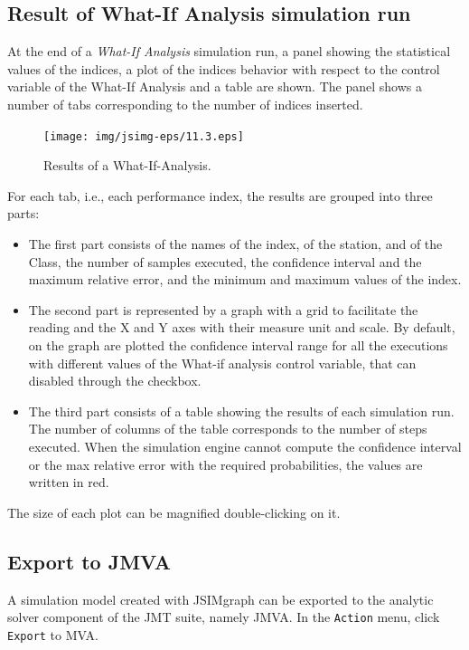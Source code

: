\subsection{Result of What-If Analysis simulation run}
At the end of a \emph{What-If Analysis} simulation run, a panel
showing the statistical values of the indices, a plot of the
indices behavior with respect to the control variable of the
What-If Analysis and a table are shown. The panel shows a number
of tabs
corresponding to the number of indices inserted.\\
\begin{figure}[htb]
    \begin{center}
        \texttt{[image: img/jsimg-eps/11.3.eps]}
    \end{center}
    \caption{Results of a What-If-Analysis.}
    \label{fig:reswia}
\end{figure}
For each tab, i.e., each performance index, the results are
grouped into three parts:
\begin{itemize}
\item  The first part consists of the names of the index, of the
station, and of the Class, the number of samples executed, the
confidence interval and the maximum relative error, and the
minimum and maximum values of the index.

\item   The second part is represented by a graph with a grid to
facilitate the reading and the X and Y axes with their measure
unit and scale. By default, on the graph are plotted the
confidence interval range for all the executions with different
values of the What-if analysis control variable, that can disabled
through the checkbox.

\item  The third part consists of a table showing the results of
each simulation run. The number of columns of the table
corresponds to the number of steps executed. When the simulation
engine cannot compute the confidence interval or the max relative
error with the required probabilities, the values are written in
red.
\end{itemize}
The size of each plot can be magnified double-clicking on it.

\subsection{Export to JMVA}
A simulation model created with JSIMgraph can be exported to the
analytic solver component of the JMT suite, namely JMVA. In the
\texttt{Action} menu, click \texttt{Export} to MVA.

